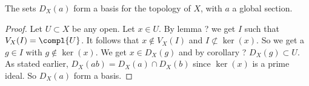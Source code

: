 \begin{lemma}
The sets $D_X(a)$ form a basis for the topology of $X$,
with $a$ a global section.
\end{lemma}
\begin{proof}
Let $U\subset X$ be any open. Let $x\in U$.
By lemma ? we get $I$ such that $V_X(I) = \compl{U}$.
It follows that $x\not\in V_X(I)$ and $I\not\subset \ker(x)$.
So we get a $g\in I$ with $g\not\in \ker(x)$.
We get $x\in D_X(g)$ and by corollary ?%
$D_X(g) \subset U$.
As stated earlier, $D_X(ab) = D_X(a) \cap D_X(b)$ since $\ker(x)$ is a prime ideal.
So $D_X(a)$ form a basis.
\end{proof}